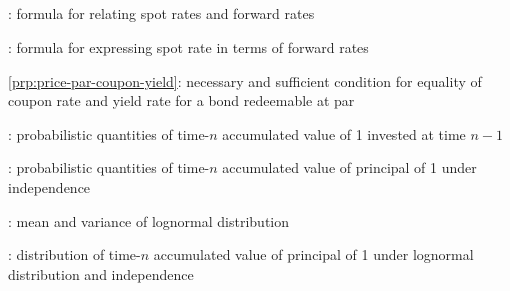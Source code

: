 \subsection*{}
\item {}: formula for relating spot rates and forward rates
\item {}: formula for expressing spot rate in terms of forward rates
\item \cref{prp:price-par-coupon-yield}: necessary and sufficient
condition for equality of coupon rate and yield rate for a bond redeemable at
par
\item {}: probabilistic
quantities of time-\(n\) accumulated value of 1 invested at time \(n-1\)
\item {}: probabilistic
quantities of time-\(n\) accumulated value of principal of 1 under independence
\item {}: mean and variance of lognormal distribution
\item {}: distribution of time-\(n\)
accumulated value of principal of 1 under lognormal distribution and
independence
